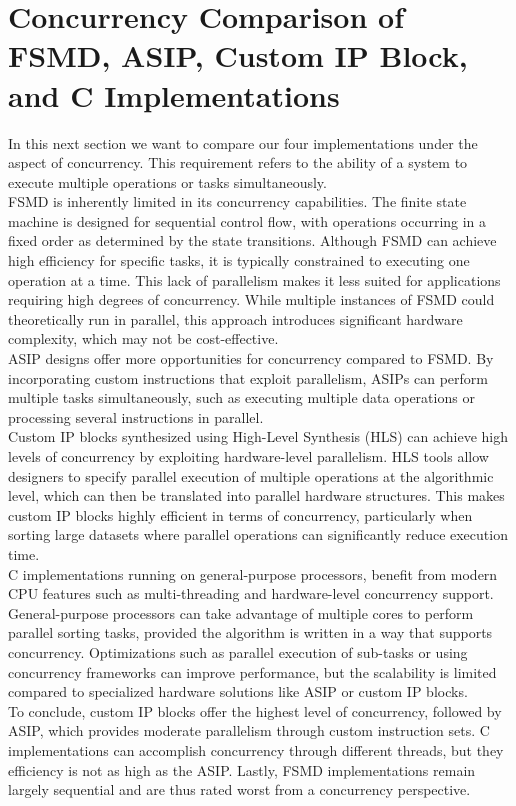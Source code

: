 \documentclass[conference]{IEEEtran}
\begin{document}
\section{Concurrency Comparison of FSMD, ASIP, Custom IP Block, and C Implementations}
In this next section we want to compare our four implementations under the aspect of concurrency. This requirement refers to the ability of a system to execute multiple operations or tasks simultaneously.\\
FSMD is inherently limited in its concurrency capabilities. The finite state machine is designed for sequential control flow, with operations occurring in a fixed order as determined by the state transitions. Although FSMD can achieve high efficiency for specific tasks, it is typically constrained to executing one operation at a time. This lack of parallelism makes it less suited for applications requiring high degrees of concurrency. While multiple instances of FSMD could theoretically run in parallel, this approach introduces significant hardware complexity, which may not be cost-effective.\\
ASIP designs offer more opportunities for concurrency compared to FSMD. By incorporating custom instructions that exploit parallelism, ASIPs can perform multiple tasks simultaneously, such as executing multiple data operations or processing several instructions in parallel.\\
Custom IP blocks synthesized using High-Level Synthesis (HLS) can achieve high levels of concurrency by exploiting hardware-level parallelism. HLS tools allow designers to specify parallel execution of multiple operations at the algorithmic level, which can then be translated into parallel hardware structures. This makes custom IP blocks highly efficient in terms of concurrency, particularly when sorting large datasets where parallel operations can significantly reduce execution time.\\
C implementations running on general-purpose processors, benefit from modern CPU features such as multi-threading and hardware-level concurrency support. General-purpose processors can take advantage of multiple cores to perform parallel sorting tasks, provided the algorithm is written in a way that supports concurrency. Optimizations such as parallel execution of sub-tasks or using concurrency frameworks can improve performance, but the scalability is limited compared to specialized hardware solutions like ASIP or custom IP blocks.\\
To conclude, custom IP blocks offer the highest level of concurrency, followed by ASIP, which provides moderate parallelism through custom instruction sets. C implementations can accomplish concurrency through different threads, but they efficiency is not as high as the ASIP. Lastly, FSMD implementations remain largely sequential and are thus rated worst from a concurrency perspective.\\
\end{document}
